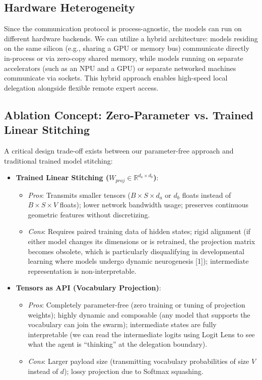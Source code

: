 \documentclass{article}
\begin{document}
\subsection{Hardware Heterogeneity}
Since the communication protocol is process-agnostic, the models can run on different hardware backends. We can utilize a hybrid architecture: models residing on the same silicon (e.g., sharing a GPU or memory bus) communicate directly in-process or via zero-copy shared memory, while models running on separate accelerators (such as an NPU and a GPU) or separate networked machines communicate via sockets. This hybrid approach enables high-speed local delegation alongside flexible remote expert access.

\subsection{Ablation Concept: Zero-Parameter vs. Trained Linear Stitching}
A critical design trade-off exists between our parameter-free approach and traditional trained model stitching:
\begin{itemize}
	\item \textbf{Trained Linear Stitching ($W_{proj} \in \mathbb{R}^{d_a \times d_b}$)}:
	\begin{itemize}
		\item \textit{Pros}: Transmits smaller tensors ($B \times S \times d_a$ or $d_b$ floats instead of $B \times S \times V$ floats); lower network bandwidth usage; preserves continuous geometric features without discretizing.
		\item \textit{Cons}: Requires paired training data of hidden states; rigid alignment (if either model changes its dimensions or is retrained, the projection matrix becomes obsolete, which is particularly disqualifying in developmental learning where models undergo dynamic neurogenesis [1]); intermediate representation is non-interpretable.
	\end{itemize}
	\item \textbf{Tensors as API (Vocabulary Projection)}:
	\begin{itemize}
		\item \textit{Pros}: Completely parameter-free (zero training or tuning of projection weights); highly dynamic and composable (any model that supports the vocabulary can join the swarm); intermediate states are fully interpretable (we can read the intermediate logits using Logit Lens to see what the agent is ``thinking'' at the delegation boundary).
		\item \textit{Cons}: Larger payload size (transmitting vocabulary probabilities of size $V$ instead of $d$); lossy projection due to Softmax squashing.
	\end{itemize}
\end{itemize}
\end{document}

